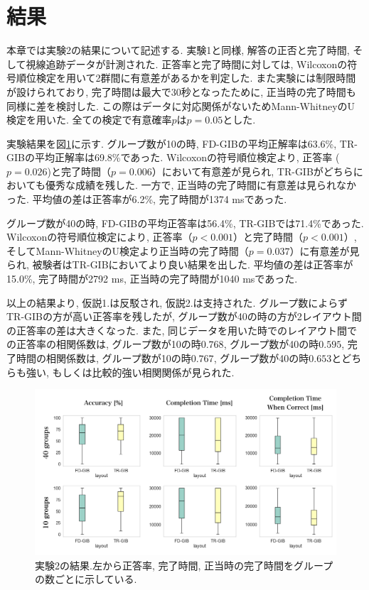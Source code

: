 \documentclass{kuee}
\begin{document}
\section{結果}
\label{sec:result-ex2}
本章では実験2の結果について記述する.
実験1と同様, 解答の正否と完了時間, そして視線追跡データが計測された.
正答率と完了時間に対しては, Wilcoxonの符号順位検定を用いて2群間に有意差があるかを判定した.
また実験には制限時間が設けられており, 完了時間は最大で30秒となったために, 正当時の完了時間も同様に差を検討した.
この際はデータに対応関係がないためMann-WhitneyのU検定を用いた.
全ての検定で有意確率$p$は$p = 0.05$とした.

実験結果を図\ref{fig:result-ex2}に示す.
グループ数が10の時, FD-GIBの平均正解率は63.6\%, TR-GIBの平均正解率は69.8\%であった.
Wilcoxonの符号順位検定より, 正答率 ($p=0.026$)と完了時間（$p=0.006$）において有意差が見られ, TR-GIBがどちらにおいても優秀な成績を残した.
一方で, 正当時の完了時間に有意差は見られなかった.
平均値の差は正答率が6.2\%, 完了時間が1374 msであった.

グループ数が40の時, FD-GIBの平均正答率は56.4\%, TR-GIBでは71.4\%であった.
Wilcoxonの符号順位検定により, 正答率（$p<0.001$）と完了時間（$p < 0.001$）, そしてMann-WhitneyのU検定より正当時の完了時間（$p = 0.037$）に有意差が見られ, 被験者はTR-GIBにおいてより良い結果を出した.
平均値の差は正答率が15.0\%, 完了時間が2792 ms, 正当時の完了時間が1040 msであった.

以上の結果より, 仮説1.は反駁され, 仮説2.は支持された.
グループ数によらずTR-GIBの方が高い正答率を残したが, グループ数が40の時の方が2レイアウト間の正答率の差は大きくなった.
また, 同じデータを用いた時でのレイアウト間での正答率の相関係数は, グループ数が10の時$0.768$, グループ数が40の時$0.595$, 完了時間の相関係数は, グループ数が10の時$0.767$, グループ数が40の時$0.653$とどちらも強い, もしくは比較的強い相関関係が見られた.

\begin{figure}[t]
  \begin{center}
  \includegraphics[width=15cm]{./images/ex2-result.png}
  \caption{実験2の結果.左から正答率, 完了時間, 正当時の完了時間をグループの数ごとに示している. \label{fig:result-ex2}}
  \end{center}
\end{figure}
\end{document}
